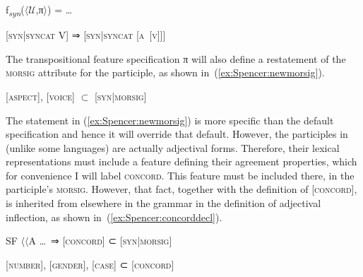 \documentclass[output=paper]{langsci/langscibook}
\begin{document}
\ea

\label{ex:Spencer:AV}

f\textsubscript{\textit{syn}}($\langle$$\mathcal{U}$,π$\rangle$) = \ldots{}

[\textsc{syn}|\textsc{syncat}  V] ⇒ [\textsc{syn}|\textsc{syncat}  \textsc{[a~[v]]}]

\z
The transpositional feature specification π will also define a restatement of the \textsc{morsig} attribute for the participle, as shown in~(\ref{ex:Spencer:newmorsig}).

\ea
 \label{ex:Spencer:newmorsig}

[\textsc{aspect}], [\textsc{voice}] $\subset$ [\textsc{syn}|\textsc{morsig}]

\z
The statement in (\ref{ex:Spencer:newmorsig}) is more specific than the default specification and hence it will override that default. However, the participles in  (unlike some languages) are actually adjectival forms. %
Therefore, their lexical representations must include a feature defining their agreement properties, which for convenience I will label \textsc{concord}. This feature must be included there, in the participle's \textsc{morsig}. However, that fact, together with the  definition of [\textsc{concord}], is inherited from elsewhere in the grammar in the definition of adjectival inflection, as shown in~(\ref{ex:Spencer:concorddecl}).

\noindent \begin{minipage}{\linewidth}
\ea
 \label{ex:Spencer:concorddecl}

	\begin{xlist}
\ex	SF $\langle\langle$A \ldots{}\  ⇒ [\textsc{concord}] ⊂ [\textsc{syn}|\textsc{morsig}]

\ex	{}[\textsc{number}], [\textsc{gender}], [\textsc{case}] ⊂ [\textsc{concord}]
	\end{xlist}
\z
\end{minipage}\bigskip
\end{document}

